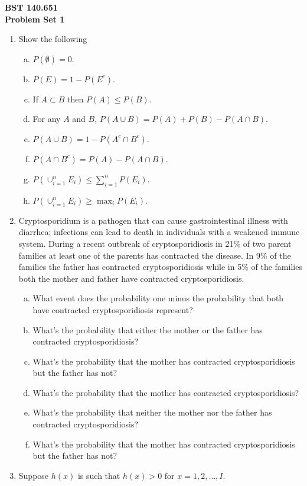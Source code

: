 \documentclass[12pt]{article}
\begin{document}
\noindent
{\bf BST 140.651 \\ Problem Set 1} \\

\begin{enumerate}[Problem 1.]
\item Show the following
\begin{enumerate}[a.]
\item  $P(\emptyset) = 0$.
\item  $P(E) = 1 - P(E^c)$.
\item  If $A \subset B$ then $P(A) \leq P(B)$.
\item  For any $A$ and $B$, $P(A \cup B) = P(A) + P(B) - P(A \cap B)$.
\item  $P(A \cup B) = 1 - P(A^c \cap B^c)$.
\item   $P(A \cap B^c) = P(A) - P(A \cap B)$.
\item  $P(\cup_{i=1}^n E_i) \leq \sum_{i=1}^n P(E_i)$.
\item  $P(\cup_{i=1}^n E_i) \geq \max_i P(E_i)$.
\end{enumerate}
\item Cryptosporidium is a pathogen that can cause gastrointestinal illness with diarrhea; infections can lead to death in individuals with a weakened
immune system. During a recent outbreak of cryptosporidiosis in 21\%
of
  two parent families at least one of the parents has contracted the
  disease.  In 9\% of the families the father has contracted
  cryptosporidiosis while in 5\% of the families both the mother and father
  have contracted cryptosporidiosis.
  \begin{enumerate}[a.]
  \item What event does the probability one minus the probability that
    both have contracted cryptosporidiosis represent?
  \item What's the probability that either the mother or the father has contracted
  cryptosporidiosis?
  \item What's the probability that the mother has contracted cryptosporidiosis but the father has not?
  \item What's the probability that the mother has contracted cryptosporidiosis?
  \item What's the probability that neither the mother nor the father has contracted cryptosporidiosis?
  \item What's the probability that the mother has contracted cryptosporidiosis but the father has not?
  \end{enumerate}
\item Suppose $h(x)$ is such that $h(x) > 0$ for $x=1,2,\ldots,I$.

\end{enumerate}
\end{document}
